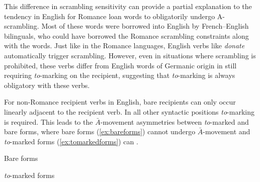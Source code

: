 This difference in scrambling sensitivity can provide a partial explanation to the tendency in English for Romance loan words to obligatorily undergo A-scrambling. Most of these words were borrowed into English by French--English bilinguals, who could have borrowed the Romance scrambling constraints along with the words. Just like in the Romance languages, English verbs like \textit{donate} automatically trigger scrambling. However, even in situations where scrambling is prohibited, these verbs differ from English words of Germanic origin in still requiring \textit{to}-marking on the recipient, suggesting that \textit{to}-marking is always obligatory with these verbs.
\begin{exe}
\ex 
\begin{xlist}
\end{xlist}
\end{exe}%
For non-Romance recipient verbs in English, bare recipients can only occur linearly adjacent to the recipient verb. In all other syntactic positions \textit{to}-marking is required. This leads to the $\bar{A}$-movement asymmetries between \textit{to}-marked and bare forms, where bare forms (\ref{ex:bareforms}) cannot undergo $\bar{A}$-movement and \textit{to}-marked forms (\ref{ex:tomarkedforms}) can \citep[and others]{Fillmore.1965,Hornstein.1981,DenDikken.1995,Hallman.2015}.%
\newpage
\begin{exe}
\ex\label{ex:bareforms} Bare forms
\begin{xlist}
\end{xlist}
\ex\label{ex:tomarkedforms} \textit{to}-marked forms
\begin{xlist}
\end{xlist}
\end{exe}%
